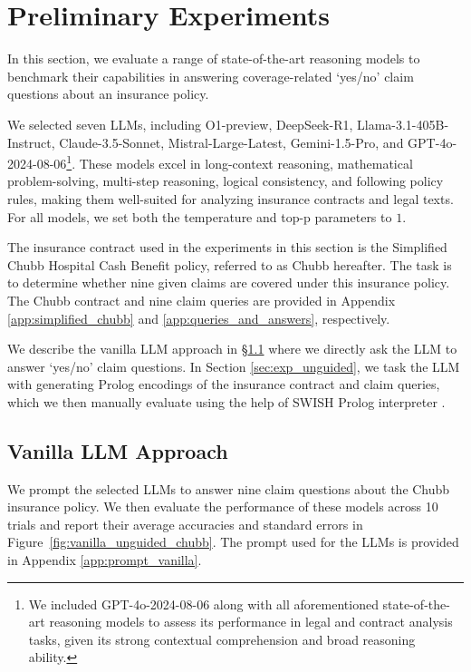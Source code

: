 \section{Preliminary Experiments}
\label{sec:exp_vanilla_unguided}
In this section, we evaluate a range of state-of-the-art reasoning models to benchmark their capabilities in answering coverage-related `yes/no' claim questions about an insurance policy.

We selected seven LLMs, including O1-preview, DeepSeek-R1, Llama-3.1-405B-Instruct, Claude-3.5-Sonnet, Mistral-Large-Latest, Gemini-1.5-Pro, and GPT-4o-2024-08-06\footnote{We included GPT-4o-2024-08-06 along with all aforementioned state-of-the-art reasoning models to assess its performance in legal and contract analysis tasks, given its strong contextual comprehension and broad reasoning ability.}. These models excel in long-context reasoning, mathematical problem-solving, multi-step reasoning, logical consistency, and following policy rules, making them well-suited for analyzing insurance contracts and legal texts. For all models, we set both the temperature and top-p parameters to $1$.

The insurance contract used in the experiments in this section is the Simplified Chubb Hospital Cash Benefit policy, referred to as Chubb hereafter. The task is to determine whether nine given claims are covered under this insurance policy. The Chubb contract and nine claim queries are provided in Appendix \ref{app:simplified_chubb} and  \ref{app:queries_and_answers}, respectively.

We describe the vanilla LLM approach in \S\ref{sec:vanilla_llm} where we directly ask the LLM to answer `yes/no' claim questions. In Section \ref{sec:exp_unguided}, we task the LLM with generating Prolog encodings of the insurance contract and claim queries, which we then manually evaluate using the help of SWISH Prolog interpreter \cite{swish}.

\subsection{Vanilla LLM Approach} 
\label{sec:vanilla_llm}
We prompt the selected LLMs to answer nine claim questions about the Chubb insurance policy. We then evaluate the performance of these models across 10 trials and report their average accuracies and standard errors in Figure~\ref{fig:vanilla_unguided_chubb}. The prompt used for the LLMs is provided in Appendix \ref{app:prompt_vanilla}.


